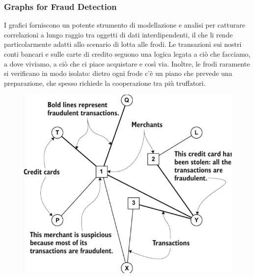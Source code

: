 \subsubsection*{Graphs for Fraud Detection}
I grafici forniscono un potente strumento di modellazione e analisi per catturare correlazioni a lungo raggio tra oggetti di dati interdipendenti, il che li rende particolarmente adatti allo scenario di lotta alle frodi. Le transazioni sui nostri conti bancari e sulle carte di credito seguono una logica legata a ciò che facciamo, a dove viviamo, a ciò che ci piace acquistare e così via. Inoltre, le frodi raramente si verificano in modo isolato: dietro ogni frode c'è un piano che prevede una preparazione, che spesso richiede la cooperazione tra più truffatori.
\begin{figure}[th]
    \centering
    \includegraphics[width=0.5\linewidth]{RecommendationsGraph//img/graphfraud.png}
\end{figure}

